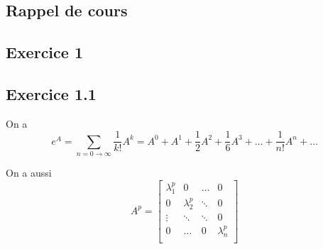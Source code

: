 \documentclass[]{book}
\theoremstyle{definition}
\begin{document}
\subsection*{Rappel de cours}

\newpage
\subsection*{Exercice 1}
\subsection*{Exercice 1.1}
On a 
$$e^A = \sum_{n= 0 \to \infty}{\frac{1}{k!}A^k} = A^0 + A^1 + \frac{1}{2}A^2 + \frac{1}{6}A^3 + \ldots + \frac{1}{n!}A^n + \ldots$$

On a aussi
$$
A^p = 
\begin{bmatrix}
\lambda_1^p & 0 & \ldots & 0 \\    
0 & \lambda_2^p  & \ddots & 0 \\
\vdots & \ddots & \ddots & 0 \\    
0 & \ldots & 0 & \lambda_n^p\\
\end{bmatrix}
$$
\end{document}
